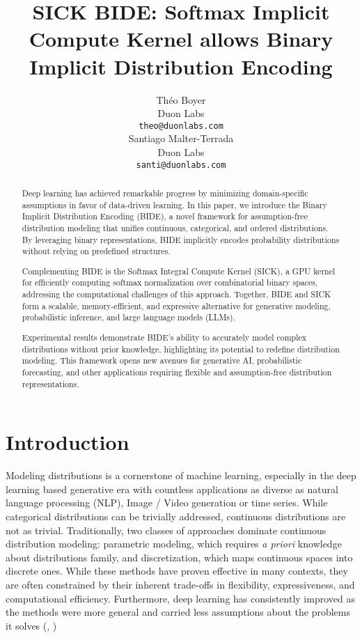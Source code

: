 \documentclass{article}
\title{SICK BIDE: Softmax Implicit Compute Kernel allows Binary Implicit Distribution Encoding
}
\author{
  Théo Boyer \\
  Duon Labs \\
  \texttt{theo@duonlabs.com} \\
   \And
  Santiago Malter-Terrada \\
  Duon Labs \\
  \texttt{santi@duonlabs.com} \\
}
\begin{document}
\setlength{\tabcolsep}{5pt} %
\renewcommand{\arraystretch}{1.2} %

\maketitle


\begin{abstract}
Deep learning has achieved remarkable progress by minimizing domain-specific assumptions in favor of data-driven learning. In this paper, we introduce the Binary Implicit Distribution Encoding (BIDE), a novel framework for assumption-free distribution modeling that unifies continuous, categorical, and ordered distributions. By leveraging binary representations, BIDE implicitly encodes probability distributions without relying on predefined structures.

Complementing BIDE is the Softmax Integral Compute Kernel (SICK), a GPU kernel for efficiently computing softmax normalization over combinatorial binary spaces, addressing the computational challenges of this approach. Together, BIDE and SICK form a scalable, memory-efficient, and expressive alternative for generative modeling, probabilistic inference, and large language models (LLMs).

Experimental results demonstrate BIDE's ability to accurately model complex distributions without prior knowledge, highlighting its potential to redefine distribution modeling. This framework opens new avenues for generative AI, probabilistic forecasting, and other applications requiring flexible and assumption-free distribution representations.
\end{abstract}




\section{Introduction}
Modeling distributions is a cornerstone of machine learning, especially in the deep learning based generative era with countless applications as diverse as natural language processing (NLP), Image / Video generation or time series. While categorical distributions can be trivially addressed, continuous distributions are not as trivial. Traditionally, two classes of approaches dominate continuous distribution modeling: parametric modeling, which requires \textit{a priori} knowledge about distributions family, and discretization, which maps continuous spaces into discrete ones. While these methods have proven effective in many contexts, they are often constrained by their inherent trade-offs in flexibility, expressiveness, and computational efficiency. Furthermore, deep learning has consistently improved as the methods were more general and carried less assumptions about the problems it solves (\cite{Silver2017}, \cite{vaswani2017attention})
\end{document}
